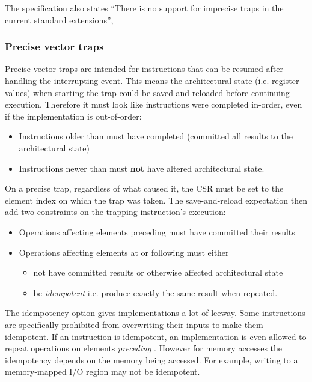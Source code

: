 The specification also states \enquote{There is no support for imprecise traps in the current standard extensions}, 

\subsubsection{Precise vector traps}
Precise vector traps are intended for instructions that can be resumed after handling the interrupting event.
This means the architectural state (i.e. register values) when starting the trap could be saved and reloaded before continuing execution.
Therefore it must look like instructions were completed in-order, even if the implementation is out-of-order:
\begin{itemize}
    \item Instructions older than  must have completed (committed all results to the architectural state)
    \item Instructions newer than  must \textbf{not} have altered architectural state.
\end{itemize}

On a precise trap, regardless of what caused it, the  CSR must be set to the element index on which the trap was taken.
The save-and-reload expectation then add two constraints on the trapping instruction's execution:
\begin{itemize}
    \item Operations affecting elements preceding  must have committed their results
    \item Operations affecting elements at or following  must either
    \begin{itemize}
        \item not have committed results or otherwise affected architectural state
        \item be \emph{idempotent} i.e. produce exactly the same result when repeated.
    \end{itemize}
\end{itemize}

The idempotency option gives implementations a lot of leeway.
Some instructions  are specifically prohibited from overwriting their inputs to make them idempotent.
If an instruction is idempotent, an implementation is even allowed to repeat operations on elements \emph{preceding} .
However for memory accesses the idempotency depends on the memory being accessed.
For example, writing to a memory-mapped I/O region may not be idempotent.

